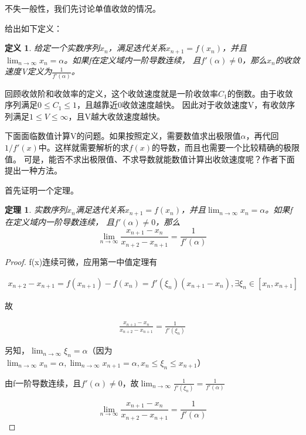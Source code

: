 \documentclass[10pt, a4paper]{article}
\newtheorem{definition}{\hspace{2em}定义}
\newtheorem{theorem}{\hspace{2em}定理}
\begin{document}
    不失一般性，我们先讨论单值收敛的情况。

    给出如下定义：

    \begin{definition}\label{def1}
        给定一个实数序列${x_n}$，满足迭代关系$x_{n+1}=f(x_n)$，并且$\lim_{n\to\infty}x_n=\alpha$。如果f在定义域内一阶导数连续，
        且$f'(\alpha)\neq 0$，那么${x_n}$的收敛速度V定义为$\frac{1}{f'(\alpha)}$。
    \end{definition}
    
    回顾收敛阶和收敛率的定义，这个收敛速度就是一阶收敛率$C_1$的倒数。由于收敛序列满足$0\le C_1\le 1$，且越靠近0收敛速度越快。
    因此对于收敛速度V，有收敛序列满足$1\le V \le \infty$，且V越大收敛速度越快。

    下面面临数值计算V的问题。如果按照定义，需要数值求出极限值$\alpha$，再代回$1/f'(x)$中。这样就需要解析的求$f(x)$的导数，而且也需要一个比较精确的极限值。
    可是，能否不求出极限值、不求导数就能数值计算出收敛速度呢？作者下面提出一种方法。

    首先证明一个定理。

    \begin{theorem}\label{thm1}
        实数序列${x_n}$满足迭代关系$x_{n+1}=f(x_n)$，并且$\lim_{n\to\infty}x_n=\alpha$。如果f在定义域内一阶导数连续，
        且$f'(\alpha)\neq 0$，那么
        \begin{equation*}
            \lim_{n \to \infty}\frac{x_{n+1}-x_n}{x_{n+2}-x_{n+1}}=\frac{1}{f'(\alpha)}
        \end{equation*}
    \end{theorem}

    \begin{proof}\label{pf1}
        f(x)连续可微，应用第一中值定理有

        \begin{align*}
            x_{n+2}-x_{n+1}=f(x_{n+1})-f(x_n)=f'(\xi_n )(x_{n+1}-x_n),\exists\xi_n \in [x_n,x_{n+1}]
        \end{align*}

        故

        \begin{align*}
            \frac{x_{n+1}-x_n}{x_{n+2}-x_{n+1}}=\frac{1}{f'(\xi_n)}
        \end{align*}

        另知，$\lim_{n \to \infty}\xi_n=\alpha$（因为$\lim_{n \to \infty}x_n=\alpha,\lim_{n \to \infty}x_{n+1}=\alpha,x_n\le\xi_n\le x_{n+1}$）

        由f一阶导数连续，且$f'(\alpha)\neq 0$，故$\lim_{n \to \infty}\frac{1}{f'(\xi_{n})}=\frac{1}{f'(\alpha)}$

        \begin{equation*}
            \lim_{n \to \infty}\frac{x_{n+1}-x_n}{x_{n+2}-x_{n+1}}=\frac{1}{f'(\alpha)}
        \end{equation*}
        \end{proof}
        
\end{document}
